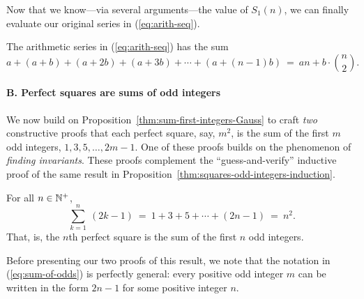 \medskip

Now that we know---via several arguments---the value of $S_1(n)$, we
can finally evaluate our original series in (\ref{eq:arith-seq}).

\begin{prop}
\label{thm:sum-of-arithmetic-series}
The arithmetic series in (\ref{eq:arith-seq}) has the sum
\[
a + (a+b) + (a+2b) + (a+3b) + \cdots + (a+(n-1)b) \ = \
an + b \cdot {n \choose 2}. 
\]
\end{prop}


\paragraph{B. Perfect squares are sums of odd integers}

We now build on Proposition~\ref{thm:sum-first-integers-Gauss} to
craft {\em two} constructive proofs that each perfect square, say,
$m^2$, is the sum of the first $m$ odd integers, $1, 3, 5, \ldots,
2m-1$.  One of these proofs builds on the phenomenon of {\em finding
  invariants}.  These proofs complement the ``guess-and-verify''
inductive proof of the same result in
Proposition~\ref{thm:squares-odd-integers-induction}.

\begin{prop}
\label{thm:squares-odd-integers-Gauss}
For all $n \in \mathbb{N}^+$,
\begin{equation}
\label{eq:sum-of-odds}
\sum_{k=1}^n \ (2k-1)
 \ = \ 1 + 3 + 5 + \cdots + (2n-1) \ = \ n^2.
\end{equation}
That, is, the $n$th perfect square is the sum of the first $n$ odd
integers.
\end{prop}

Before presenting our two proofs of this result, we note that the
notation in (\ref{eq:sum-of-odds}) is perfectly general: every positive
odd integer $m$ can be written in the form $2n-1$ for some positive
integer $n$.

\smallskip

